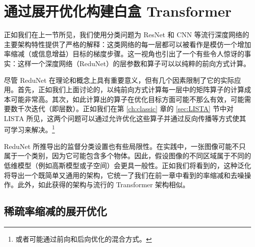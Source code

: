 \documentclass[../../book-main_zh.tex]{subfiles}
\begin{document}
\section{通过展开优化构建白盒 Transformer}\label{sec:chap4-white-box-transformer}
正如我们在上一节所见，我们使用分类问题为 ResNet 和 CNN 等流行深度网络的主要架构特性提供了严格的解释：这类网络的每一层都可以被看作是模仿一个增加率缩减（或信息增益）目标的梯度步骤。这一视角也引出了一个有些令人惊讶的事实：这样一个深度网络（ReduNet）的层参数和算子可以以纯粹的前向方式计算。

尽管 ReduNet 在理论和概念上具有重要意义，但有几个因素限制了它的实际应用。首先，正如我们上面讨论的，以纯前向方式计算每一层中的矩阵算子的计算成本可能非常高。其次，如此计算出的算子在优化目标方面可能不那么有效，可能需要数千次迭代（即层数）。正如我们在第 \ref{ch:classic} 章的 \ref{sec:LISTA} 节中对 LISTA 所见，这两个问题可以通过允许优化这些算子并通过反向传播等方式使其可学习来解决。\footnote{或者可能通过前向和后向优化的混合方式。}

ReduNet 所推导出的监督分类设置也有些局限性。在实践中，一张图像可能不只属于一个类别，因为它可能包含多个物体。因此，假设图像的不同区域属于不同的低维模型（例如高斯模型或子空间）会更具一般性。正如我们将看到的，这种泛化将导出一个既简单又通用的架构，它统一了我们在前一章中看到的率缩减和去噪操作。此外，如此获得的架构与流行的 Transformer 架构相似。



\subsection{稀疏率缩减的展开优化}


\end{document}
